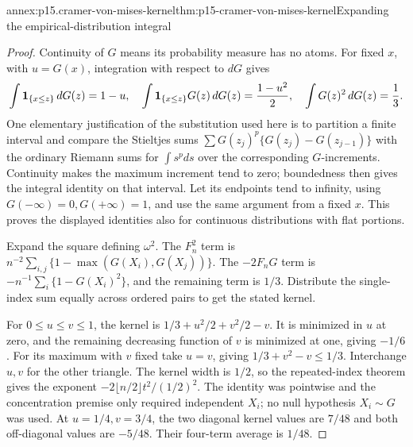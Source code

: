 \begin{annexitem}{annex:p15.cramer-von-mises-kernel}{thm:p15-cramer-von-mises-kernel}{Expanding the empirical-distribution integral}
\begin{proof}
Continuity of \(G\) means its probability measure has no atoms.
For fixed \(x\), with \(u=G(x)\), integration with respect to \(dG\)
gives
\[
 \int{\bf1}_{\{x\leq z\}}\,dG(z)=1-u,\quad
 \int{\bf1}_{\{x\leq z\}}G(z)\,dG(z)=\frac{1-u^2}{2},\quad
 \int G(z)^2\,dG(z)=\frac13.
\]
One elementary justification of the substitution used here is to
partition a finite interval and compare the Stieltjes sums
\(\sum G(z_j)^p\{G(z_j)-G(z_{j-1})\}\) with the ordinary Riemann
sums for \(\int s^pds\) over the corresponding \(G\)-increments.
Continuity makes the maximum increment tend to zero; boundedness
then gives the integral identity on that interval. Let its endpoints
tend to infinity, using \(G(-\infty)=0,G(+\infty)=1\), and use the
same argument from a fixed \(x\). This proves the displayed identities
also for continuous distributions with flat portions.

Expand the square defining \(\omega^2\). The \(F_n^2\) term is
\(n^{-2}\sum_{i,j}\{1-\max(G(X_i),G(X_j))\}\).
The \(-2F_nG\) term is
\(-n^{-1}\sum_i\{1-G(X_i)^2\}\), and the remaining term is \(1/3\).
Distribute the single-index sum equally across ordered pairs to get
the stated kernel.

For \(0\leq u\leq v\leq1\), the kernel is
\(1/3+u^2/2+v^2/2-v\).
It is minimized in \(u\) at zero, and the remaining decreasing function
of \(v\) is minimized at one, giving \(-1/6\).
For its maximum with \(v\) fixed take \(u=v\), giving
\(1/3+v^2-v\leq1/3\). Interchange \(u,v\) for the other triangle.
The kernel width is \(1/2\), so the repeated-index theorem gives
the exponent \(-2\lfloor n/2\rfloor t^2/(1/2)^2\).
The identity was pointwise and the concentration premise only required
independent \(X_i\); no null hypothesis \(X_i\sim G\) was used.
At \(u=1/4,v=3/4\), the two diagonal kernel values are \(7/48\)
and both off-diagonal values are \(-5/48\).
Their four-term average is \(1/48\).
\end{proof}
\end{annexitem}

